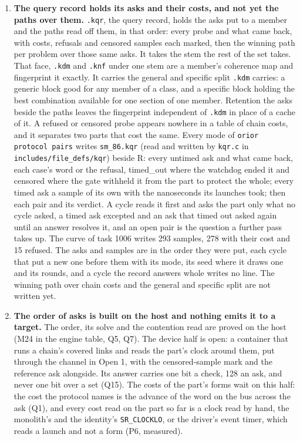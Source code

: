 \begin{enumerate}
\item \textbf{The query record holds its asks and their costs, and not yet the paths over them.} \texttt{.\allowbreak{}kqr}, the query record, holds the asks put to a member and the paths read off them, in that order: every probe and what came back, with costs, refusals and censored samples each marked, then the winning path per problem over those same asks. It takes the stem the rest of the set takes. That face, \texttt{.\allowbreak{}kdm} and \texttt{.\allowbreak{}knf} under one stem are a member's coherence map and fingerprint it exactly. It carries the general and specific split \texttt{.\allowbreak{}kdm} carries: a generic block good for any member of a class, and a specific block holding the best combination available for one section of one member. Retention the asks beside the paths leaves the fingerprint independent of \texttt{.\allowbreak{}kdm} in place of a cache of it. A refused or censored probe appears nowhere in a table of chain costs, and it separates two parts that cost the same. Every mode of \texttt{orior protocol pairs} writes \texttt{sm\_\allowbreak{}86.\allowbreak{}kqr} (read and written by \texttt{kqr.\allowbreak{}c} in \texttt{includes/\allowbreak{}file\_\allowbreak{}defs/\allowbreak{}kqr}) beside R: every untimed ask and what came back, each case's word or the refusal, timed\_\allowbreak{}out where the watchdog ended it and censored where the gate withheld it from the part to protect the whole; every timed ask a sample of its own with the nanoseconds its launches took; then each pair and its verdict. A cycle reads it first and asks the part only what no cycle asked, a timed ask excepted and an ask that timed out asked again until an answer resolves it, and an open pair is the question a further pass takes up. The curve of task 1006 writes 293 samples, 278 with their cost and 15 refused. The asks and samples are in the order they were put, each cycle that put a new one before them with its mode, its seed where it draws one and its rounds, and a cycle the record answers whole writes no line. The winning path over chain costs and the general and specific split are not written yet.
\item \textbf{The order of asks is built on the host and nothing emits it to a target.} The order, its solve and the contention read are proved on the host (M24 in the engine table, Q5, Q7). The device half is open: a container that runs a chain's covered links and reads the part's clock around them, put through the channel in Open 1, with the censored-sample mark and the reference ask alongside. Its answer carries one bit a check, 128 an ask, and never one bit over a set (Q15). The costs of the part's forms wait on this half: the cost the protocol names is the advance of the word on the bus across the ask (Q1), and every cost read on the part so far is a clock read by hand, the monolith's and the identity's \texttt{SR\_\allowbreak{}CLOCKLO}, or the driver's event timer, which reads a launch and not a form (P6, measured).

\end{enumerate}
